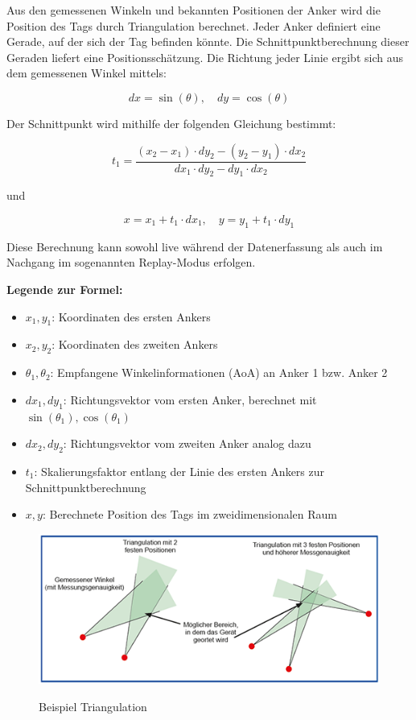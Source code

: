 \documentclass[a4paper, 12pt]{article} %
\begin{document}
Aus den gemessenen Winkeln und bekannten Positionen der Anker wird die Position des Tags durch Triangulation berechnet. Jeder Anker 
definiert eine Gerade, auf der sich der Tag befinden könnte. Die Schnittpunktberechnung dieser Geraden liefert eine Positionsschätzung. Die Richtung 
jeder Linie ergibt sich aus dem gemessenen Winkel mittels:

\[
dx = \sin(\theta), \quad dy = \cos(\theta)
\]

Der Schnittpunkt wird mithilfe der folgenden Gleichung bestimmt:

\[
t_1 = \frac{(x_2 - x_1) \cdot dy_2 - (y_2 - y_1) \cdot dx_2}
           {dx_1 \cdot dy_2 - dy_1 \cdot dx_2}
\]

und

\[
x = x_1 + t_1 \cdot dx_1, \quad y = y_1 + t_1 \cdot dy_1
\]

Diese Berechnung kann sowohl live während der Datenerfassung als auch im Nachgang im sogenannten Replay-Modus erfolgen.

\vspace{1em}
\textbf{Legende zur Formel:}
\begin{itemize}
    \item $x_1, y_1$: Koordinaten des ersten Ankers
    \item $x_2, y_2$: Koordinaten des zweiten Ankers
    \item $\theta_1, \theta_2$: Empfangene Winkelinformationen (\ac{AoA}) an Anker 1 bzw. Anker 2
    \item $dx_1, dy_1$: Richtungsvektor vom ersten Anker, berechnet mit $\sin(\theta_1), \cos(\theta_1)$
    \item $dx_2, dy_2$: Richtungsvektor vom zweiten Anker analog dazu
    \item $t_1$: Skalierungsfaktor entlang der Linie des ersten Ankers zur Schnittpunktberechnung
    \item $x, y$: Berechnete Position des Tags im zweidimensionalen Raum
\end{itemize}

\begin{figure}[H]
    \includegraphics[width=1\linewidth]{images/1906_abbildung1 (1)}\\[1ex]
    \centering
    \caption{Beispiel Triangulation}
    \label{ABBILDUNG}
\end{figure}
\end{document}
